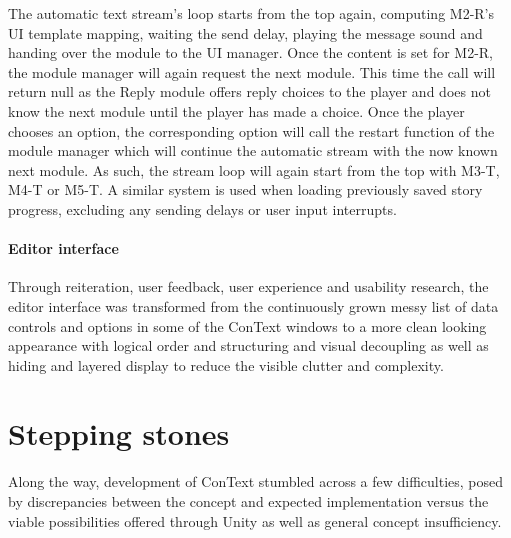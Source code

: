 The automatic text stream's loop starts from the top again, computing M2-R's UI template mapping, waiting the send delay, playing the message sound and handing over the module to the UI manager. Once the content is set for M2-R, the module manager will again request the next module. This time the call will return null as the Reply module offers reply choices to the player and does not know the next module until the player has made a choice. Once the player chooses an option, the corresponding option will call the restart function of the module manager which will continue the automatic stream with the now known next module. 
As such, the stream loop will again start from the top with M3-T, M4-T or M5-T. 
A similar system is used when loading previously saved story progress, excluding any sending delays or user input interrupts. 
\paragraph{Editor interface} Through reiteration, user feedback, user experience and usability research, the editor interface was transformed from the continuously grown messy list of data controls and options in some of the ConText windows to a more clean looking appearance with logical order and structuring and visual decoupling as well as hiding and layered display to reduce the visible clutter and complexity.

\section{Stepping stones}
Along the way, development of ConText stumbled across a few difficulties, posed by discrepancies between the concept and expected implementation versus the viable possibilities offered through Unity as well as general concept insufficiency. 
